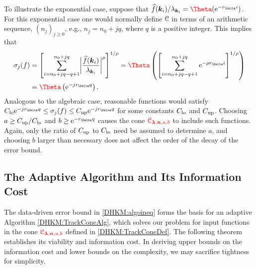 \documentclass[USenglish]{article}
\theoremstyle{dgthm}
\theoremstyle{dgthm}
\theoremstyle{dgthm}
\theoremstyle{dgthm}
\theoremstyle{dgdef}
\theoremstyle{definition}
\newcommand{\hf}{\widehat{f}}
\newcommand{\lo}{\textup{lo}}
\newcommand{\up}{\textup{up}}
\newcommand{\E}{\textup{e}}
\newcommand{\biggabs}[1]{\ensuremath{\biggl \lvert #1 \biggr \rvert}}
\newcommand{\DHKMchange}[1]{{\color{red}{#1}}}
\begin{document}
To illustrate the exponential case, suppose that $\hf(\bsk_i)/\lambda_{\bsk_i} = \DHKMchange{\Theta}(\E^{-r_\Delta i})$.  For this exponential case one would normally define ${\mathcal{C}}$ in terms of an arithmetic sequence, $(n_j)_{j\ge 0}$, e.g., $n_j = n_0 + j q$, where $q$ is a positive integer.  This implies that 
\begin{align*}
    \sigma_j(f) &= \left[ \sum_{i=n_0 + j q -q + 1}^{n_0 + j q} \biggabs{\frac{\hf(\bsk_i)}{\lambda_{\bsk_i}}}^\rho \right]^{1/\rho}
    = \DHKMchange{\Theta} \left( \left [ \sum_{i=n_0 + j q -q + 1}^{n_0 + j q} \E^{- \rho r_\Delta i} \right]^{1/\rho} \right) \\
    & = \DHKMchange{\Theta} \left(  \E^{-j r_{\Delta} q} \right).
\end{align*}
Analogous to the algebraic case, reasonable functions would satisfy 
    $C_{\lo} \E^{-j r_{\Delta} q} \le \sigma_j(f) \le C_{\up} \E^{-j r_{\Delta} q}$
for some constants $C_{\lo}$ and $C_{\up}$.  Choosing $a \ge C_{\up}/C_{\lo} $  and $b \ge \E^{- r_{\Delta} q}$ causes the cone $\DHKMchange{\calC_{\boldsymbol{\lambda},\bsn,a,b}}$ to include such functions.  Again, only the ratio of $C_{\up}$ to $C_{\lo}$ need be assumed to determine $a$, and choosing $b$ larger than necessary does not affect the order of the decay of the error bound.

\subsection{The Adaptive Algorithm and Its Information Cost} \label{DHKM:SecAdapAlgTrackDecay}

The data-driven error bound in \eqref{DHKM:algoineq} forms the basis for an adaptive Algorithm \ref{DHKM:TrackConeAlg}, which solves our problem for input functions in the cone $\DHKMchange{\calC_{\boldsymbol{\lambda},\bsn,a,b}}$ defined in \eqref{DHKM:TrackConeDef}.  The following theorem establishes its viability and information cost. In deriving upper bounds on the information cost and lower bounds on the complexity, we may sacrifice tightness for simplicity.
\end{document}

